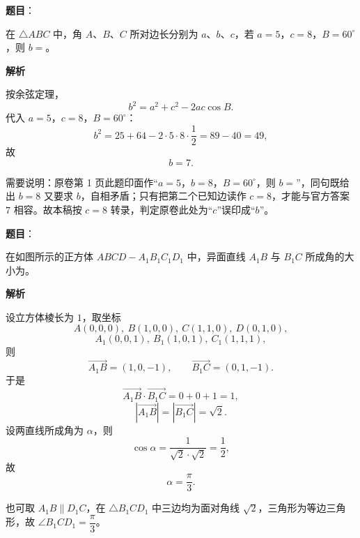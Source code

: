 \begin{answer}

\textbf{题目}：

在 $\triangle ABC$ 中，角 $A$、$B$、$C$ 所对边长分别为 $a$、$b$、$c$，若 $a=5$，$c=8$，$B=60^\circ$，则 $b=$\gkblank{}。

\textbf{解析}

按余弦定理，
\nopagebreak[4]
\[b^2=a^2+c^2-2ac\cos B.\]
代入 $a=5$，$c=8$，$B=60^\circ$：
\nopagebreak[4]
\[b^2=25+64-2\cdot5\cdot8\cdot\frac12=89-40=49,\]
故
\nopagebreak[4]
\[b=7.\]

需要说明：原卷第 1 页此题印面作“$a=5$，$b=8$，$B=60^\circ$，则 $b=$”，同句既给出 $b=8$ 又要求 $b$，自相矛盾；只有把第二个已知边读作 $c=8$，才能与官方答案 $7$ 相容。故本稿按 $c=8$ 转录，判定原卷此处为“$c$”误印成“$b$”。


\end{answer}
\begin{answer}

\textbf{题目}：

在如图所示的正方体 $ABCD-A_1B_1C_1D_1$ 中，异面直线 $A_1B$ 与 $B_1C$ 所成角的大小为\gkblank{}。
\nopagebreak[4]
\begin{center}\end{center}
\nopagebreak[4]
\textbf{解析}

设立方体棱长为 $1$，取坐标
\nopagebreak[4]
\[A(0,0,0),\ B(1,0,0),\ C(1,1,0),\ D(0,1,0),\]
\nopagebreak[4]
\[A_1(0,0,1),\ B_1(1,0,1),\ C_1(1,1,1),\]
则
\nopagebreak[4]
\[\overrightarrow{A_1B}=(1,0,-1),\qquad \overrightarrow{B_1C}=(0,1,-1).\]
于是
\nopagebreak[4]
\[\overrightarrow{A_1B}\cdot\overrightarrow{B_1C}=0+0+1=1,\]
\nopagebreak[4]
\[|\overrightarrow{A_1B}|=|\overrightarrow{B_1C}|=\sqrt2.\]
设两直线所成角为 $\alpha$，则
\nopagebreak[4]
\[\cos\alpha=\frac{1}{\sqrt2\cdot\sqrt2}=\frac12,\]
故
\nopagebreak[4]
\[\alpha=\frac\pi3.\]

也可取 $A_1B\parallel D_1C$，在 $\triangle B_1CD_1$ 中三边均为面对角线 $\sqrt2$，三角形为等边三角形，故 $\angle B_1CD_1=\dfrac\pi3$。


\end{answer}
